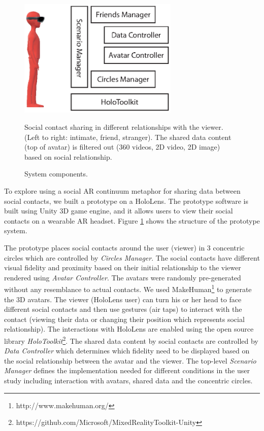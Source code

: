 \begin{figure}[ht]
    \centering
    \includegraphics[width=3in]{images/chi/images-03.eps}
    \caption{Social contact sharing in different relationships with the viewer. (Left to right: intimate, friend, stranger). The shared data content (top of avatar) is filtered out (360 videos, 2D video, 2D image) based on social relationship.}
      \caption{System components.}
      \label{fig:data:system}
\end{figure}

To explore using a social AR continuum metaphor for sharing data between social contacts, we built a prototype on a HoloLens. The prototype software is built using Unity 3D game engine, and it allows users to view their social contacts on a wearable AR headset. Figure \ref{fig:data:system} shows the structure of the prototype system. 

The prototype places social contacts around the user (viewer) in 3 concentric circles which are controlled by \textit{Circles Manager}. The social contacts have different visual fidelity and proximity based on their initial relationship to the viewer rendered using \textit{Avatar Controller}. The avatars were randomly pre-generated without any resemblance to actual contacts. We used MakeHuman\footnote{http://www.makehuman.org/} to generate the 3D avatars. The viewer (HoloLens user) can turn his or her head to face different social contacts and then use gestures (air taps) to interact with the contact (viewing their data or changing their position which represents social relationship). The interactions with HoloLens are enabled using the open source library \textit{HoloToolkit}\footnote{https://github.com/Microsoft/MixedRealityToolkit-Unity}. The shared data content by social contacts are controlled by \textit{Data Controller} which determines which fidelity need to be displayed based on the social relationship between the avatar and the viewer. The top-level \textit{Scenario Manager} defines the implementation needed for different conditions in the user study including interaction with avatars, shared data and the concentric circles. 

